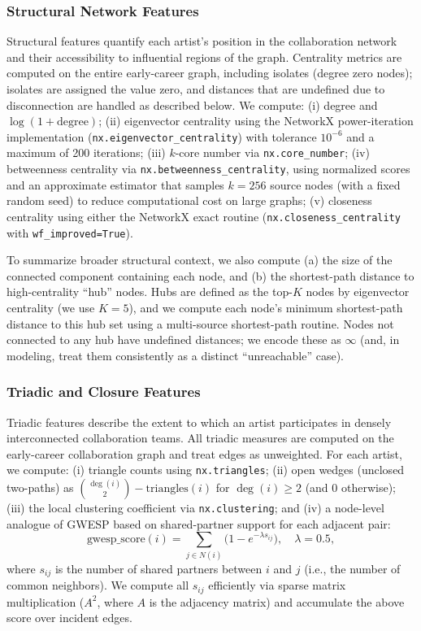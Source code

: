 \documentclass[fleqn,10pt]{wlscirep}
\begin{document}
\subsubsection*{Structural Network Features}
Structural features quantify each artist’s position in the collaboration network and their accessibility to influential regions of the graph. Centrality metrics are computed on the entire early-career graph, including isolates (degree zero nodes); isolates are assigned the value zero, and distances that are undefined due to disconnection are handled as described below.
We compute:
(i) degree and $\log(1+\text{degree})$;
(ii) eigenvector centrality using the NetworkX power-iteration implementation (\texttt{nx.eigenvector\_centrality}) with tolerance $10^{-6}$ and a maximum of 200 iterations;
(iii) $k$-core number via \texttt{nx.core\_number};
(iv) betweenness centrality via \texttt{nx.betweenness\_centrality}, using normalized scores and an approximate estimator that samples $k=256$ source nodes (with a fixed random seed) to reduce computational cost on large graphs;
(v) closeness centrality using either the NetworkX exact routine (\texttt{nx.closeness\_centrality} with \texttt{wf\_improved=True}).

To summarize broader structural context, we also compute (a) the size of the connected component containing each node, and (b) the shortest-path distance to high-centrality ``hub'' nodes. Hubs are defined as the top-$K$ nodes by eigenvector centrality (we use $K=5$), and we compute each node’s minimum shortest-path distance to this hub set using a multi-source shortest-path routine. Nodes not connected to any hub have undefined distances; we encode these as $\infty$ (and, in modeling, treat them consistently as a distinct ``unreachable'' case).

\subsubsection*{Triadic and Closure Features}
Triadic features describe the extent to which an artist participates in densely interconnected collaboration teams. All triadic measures are computed on the early-career collaboration graph and treat edges as unweighted. For each artist, we compute:
(i) triangle counts using \texttt{nx.triangles};
(ii) open wedges (unclosed two-paths) as $\binom{\deg(i)}{2} - \text{triangles}(i)$ for $\deg(i)\ge 2$ (and 0 otherwise);
(iii) the local clustering coefficient via \texttt{nx.clustering}; and
(iv) a node-level analogue of GWESP based on shared-partner support for each adjacent pair:
\begin{equation}
\text{gwesp\_score}(i)
= \sum_{j \in N(i)} \bigl(1 - e^{-\lambda s_{ij}}\bigr),
\quad \lambda = 0.5,
\end{equation}
where $s_{ij}$ is the number of shared partners between $i$ and $j$ (i.e., the number of common neighbors). We compute all $s_{ij}$ efficiently via sparse matrix multiplication ($A^2$, where $A$ is the adjacency matrix) and accumulate the above score over incident edges.
\end{document}
